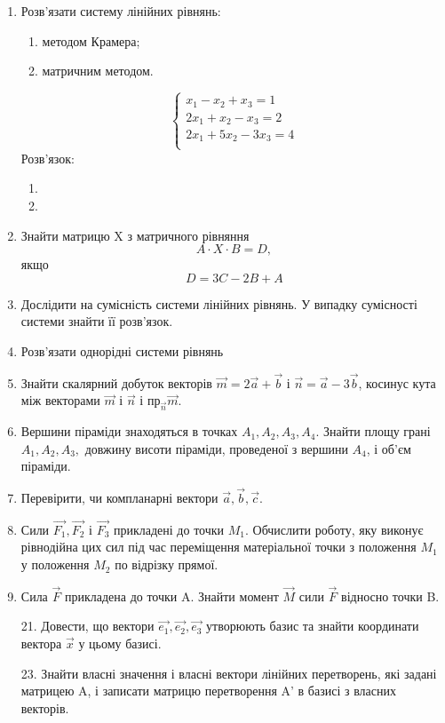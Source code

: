 \documentclass{article}
\begin{document}
{\begin{enumerate}
	\item Розв'язати систему лінійних рівнянь:
\begin{enumerate}
	\item методом Крамера;
	\item матричним методом.
\end{enumerate}
\begin{equation}
\begin{cases}
	x_1-x_2+x_3=1\\
	2x_1+x_2-x_3=2\\
	2x_1+5x_2-3x_3=4\\
\end{cases}
\end{equation}
Розв'язок:
\begin{enumerate}
	\item
	\item
\end{enumerate}
\item Знайти матрицю X з матричного рівняння $$A \cdot X \cdot B=D, $$якщо$$ D=3C-2B+A$$
\item Дослідити на сумісність системи лінійних рівнянь. У випадку сумісності системи знайти її розв'язок.
\item Розв'язати однорідні системи рівнянь
\item Знайти скалярний добуток векторів $\vec{m}=2\vec{a}+\vec{b}$ і $\vec{n}=\vec{a}-3\vec{b}$, косинус кута між векторами $\vec{m}$ і $\vec{n}$ і пр$_{\vec{n}}\vec{m}.$
\item Вершини піраміди знаходяться в точках $A_1, A_2, A_3, A_4.$ Знайти площу грані $A_1, A_2, A_3,$ довжину висоти піраміди, проведеної з вершини $A_4$, і об'єм піраміди.
\item Перевірити, чи компланарні вектори $\vec{a}, \vec{b}, \vec{c}.$
\item Сили $\vec{F_1},\vec{F_2}$ і $\vec{F_3}$ прикладені до точки $M_1$. Обчислити роботу, яку виконує рівнодійна цих сил під час переміщення матеріальної точки з положення $M_1$ у положення $M_2$ по відрізку прямої.
\item Сила $\vec{F}$ прикладена до точки A. Знайти момент $\vec{M}$ сили $\vec{F}$ відносно точки B.
\item[21.] Довести, що вектори $\vec{e_1},\vec{e_2},\vec{e_3}$ утворюють базис та знайти координати вектора $\vec{x}$ у цьому базисі.
\item[23.] Знайти власні значення і власні вектори лінійних перетворень, які задані матрицею A, і записати матрицю перетворення A' в базисі з власних векторів.
\end{enumerate}

}
\end{document}
